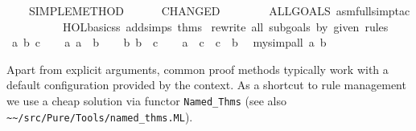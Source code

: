 \begin{isabellebody}
\ \ \ \ SIMPLE{}METHOD\isanewline
\ \ \ \ \ \ {}CHANGED\isanewline
\ \ \ \ \ \ \ \ {}ALLGOALS\ {}asm{}full{}simp{}tac\isanewline
\ \ \ \ \ \ \ \ \ \ {}HOL{}basic{}ss\ addsimps\ thms{}{}{}{}{}\isanewline
{}\ {}rewrite\ all\ subgoals\ by\ given\ rules{}%
\endisatagML
{\isafoldML}%
%
\isadelimML
%
\endisadelimML
\isanewline
\isanewline
{}\isamarkupfalse%
\isanewline
{}\isanewline
%
\isadelimproof
\ \ %
\endisadelimproof
%
\isatagproof
{}\isamarkupfalse%
\ a\ b\ c\isanewline
\ \ \isamarkupfalse%
\ a{}\ {}a\ {}\ b{}\isanewline
\ \ \isamarkupfalse%
\ b{}\ {}b\ {}\ c{}\isanewline
\ \ \isamarkupfalse%
\ {}a\ {}\ c{}\ \ {}c\ {}\ b{}\ \isamarkupfalse%
\ {}my{}simp{}all\ a\ b{}%
\endisatagproof
{\isafoldproof}%
%
\isadelimproof
\isanewline
%
\endisadelimproof
{}\isamarkupfalse%
%
\begin{isamarkuptext}%
\medskip Apart from explicit arguments, common proof methods
  typically work with a default configuration provided by the context.
  As a shortcut to rule management we use a cheap solution via functor
  \verb|Named_Thms| (see also \verb|~~/src/Pure/Tools/named_thms.ML|).%
\end{isamarkuptext}%

\end{isabellebody}
